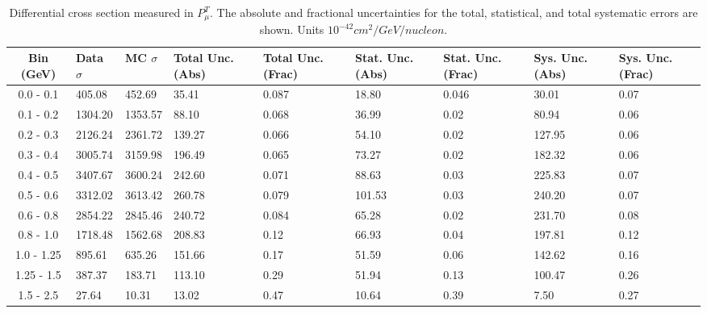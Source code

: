 \begin{table}[!htb]
    \centering
    \tiny
    \begin{tabular}{|c|p{0.5in}|p{0.5in}|p{0.5in}|p{0.5in}|p{0.5in}|p{0.5in}|p{0.5in}|p{0.5in}|}
        \hline
        Bin (GeV)& Data $\sigma$ & MC $\sigma$ & Total Unc. (Abs) & Total Unc. (Frac)  & Stat. Unc. (Abs) & Stat. Unc. (Frac) & Sys. Unc. (Abs) & Sys. Unc. (Frac)\\ \hline

0.0 - 0.1 & 405.08 & 452.69 & 35.41 & 0.087 & 18.80 & 0.046 & 30.01 & 0.07\\ \hline
0.1 - 0.2 & 1304.20 & 1353.57 & 88.10 & 0.068 & 36.99 & 0.02 & 80.94 & 0.06\\ \hline
0.2 - 0.3 & 2126.24 & 2361.72 & 139.27 & 0.066 & 54.10 & 0.02 & 127.95 & 0.06\\ \hline
0.3 - 0.4 & 3005.74 & 3159.98 & 196.49 & 0.065 & 73.27 & 0.02 & 182.32 & 0.06\\ \hline
0.4 - 0.5 & 3407.67 & 3600.24 & 242.60 & 0.071 & 88.63 & 0.03 & 225.83 & 0.07\\ \hline
0.5 - 0.6 & 3312.02 & 3613.42 & 260.78 & 0.079 & 101.53 & 0.03 & 240.20 & 0.07\\ \hline
0.6 - 0.8 & 2854.22 & 2845.46 & 240.72 & 0.084 & 65.28 & 0.02 & 231.70 & 0.08\\ \hline
0.8 - 1.0 & 1718.48 & 1562.68 & 208.83 & 0.12 & 66.93 & 0.04 & 197.81 & 0.12\\ \hline
1.0 - 1.25 & 895.61 & 635.26 & 151.66 & 0.17 & 51.59 & 0.06 & 142.62 & 0.16\\ \hline
1.25 - 1.5 & 387.37 & 183.71 & 113.10 & 0.29 & 51.94 & 0.13 & 100.47 & 0.26\\ \hline
1.5 - 2.5 & 27.64 & 10.31 & 13.02 & 0.47 & 10.64 & 0.39 & 7.50 & 0.27\\ \hline

    \end{tabular}
    \caption{Differential cross section measured in $P^T_\mu$. The absolute and fractional uncertainties for the total, statistical, and total systematic errors are shown. Units $10^{-42}cm^2/GeV/nucleon$.}
    \label{tab:ApdxA:XSecTable1Dptmu}
\end{table}

